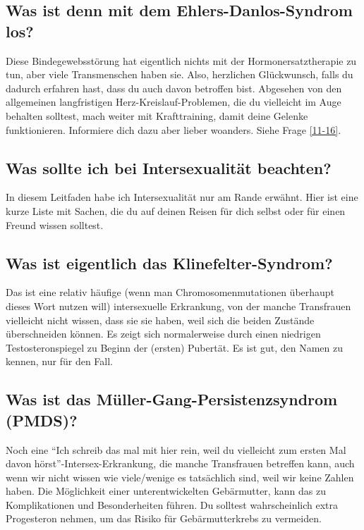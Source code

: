 \documentclass{article}
\begin{document}
\subsection{Was ist denn mit dem Ehlers-Danlos-Syndrom los?}

Diese Bindegewebsstörung hat eigentlich nichts mit der Hormonersatztherapie zu tun, aber viele Transmenschen haben sie. Also, herzlichen Glückwunsch, falls du dadurch erfahren hast, dass du auch davon betroffen bist. Abgesehen von den allgemeinen langfristigen Herz-Kreislauf-Problemen, die du vielleicht im Auge behalten solltest, mach weiter mit Krafttraining, damit deine Gelenke funktionieren. Informiere dich dazu aber lieber woanders. Siehe Frage \ref{11-16}.

\subsection{Was sollte ich bei Intersexualität beachten?}

In diesem Leitfaden habe ich Intersexualität nur am Rande erwähnt. Hier ist eine kurze Liste mit Sachen, die du auf deinen Reisen für dich selbst oder für einen Freund wissen solltest.

\subsection{Was ist eigentlich das Klinefelter-Syndrom?}

Das ist eine relativ häufige (wenn man Chromosomenmutationen überhaupt dieses Wort nutzen will) intersexuelle Erkrankung, von der manche Transfrauen vielleicht nicht wissen, dass sie sie haben, weil sich die beiden Zustände überschneiden können. Es zeigt sich normalerweise durch einen niedrigen Testosteronspiegel zu Beginn der (ersten) Pubertät. Es ist gut, den Namen zu kennen, nur für den Fall.

\subsection{Was ist das Müller-Gang-Persistenzsyndrom (PMDS)?}

Noch eine “Ich schreib das mal mit hier rein, weil du vielleicht zum ersten Mal davon hörst”-Intersex-Erkrankung, die manche Transfrauen betreffen kann, auch wenn wir nicht wissen wie viele/wenige es tatsächlich sind, weil wir keine Zahlen haben. Die Möglichkeit einer unterentwickelten Gebärmutter, kann das zu Komplikationen und Besonderheiten führen. Du solltest wahrscheinlich extra Progesteron nehmen, um das Risiko für Gebärmutterkrebs zu vermeiden.
\end{document}
